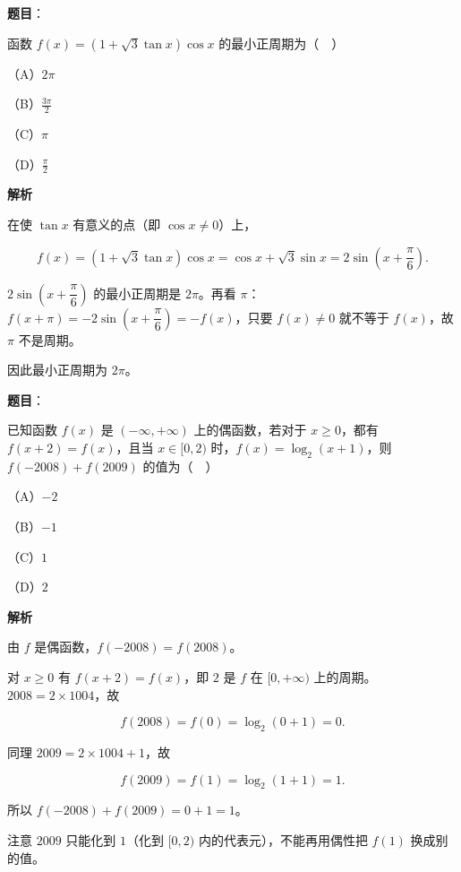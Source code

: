 \begin{answer}

\textbf{题目}：

函数 $f(x)=(1+\sqrt3\tan x)\cos x$ 的最小正周期为（　）

（A）$2\pi$

（B）$\frac{3\pi}{2}$

（C）$\pi$

（D）$\frac{\pi}{2}$

\textbf{解析}

在使 $\tan x$ 有意义的点（即 $\cos x\neq0$）上，

\nopagebreak[4]
\[f(x)=(1+\sqrt3\tan x)\cos x=\cos x+\sqrt3\sin x=2\sin\left(x+\frac{\pi}{6}\right).\]

$2\sin\left(x+\dfrac{\pi}{6}\right)$ 的最小正周期是 $2\pi$。再看 $\pi$：$f(x+\pi)=-2\sin\left(x+\dfrac{\pi}{6}\right)=-f(x)$，只要 $f(x)\neq0$ 就不等于 $f(x)$，故 $\pi$ 不是周期。

因此最小正周期为 $2\pi$。


\end{answer}
\begin{answer}

\textbf{题目}：

已知函数 $f(x)$ 是 $(-\infty,+\infty)$ 上的偶函数，若对于 $x\geqslant0$，都有 $f(x+2)=f(x)$，且当 $x\in[0,2)$ 时，$f(x)=\log_2(x+1)$，则 $f(-2008)+f(2009)$ 的值为（　）

（A）$-2$

（B）$-1$

（C）$1$

（D）$2$

\textbf{解析}

由 $f$ 是偶函数，$f(-2008)=f(2008)$。

对 $x\geqslant0$ 有 $f(x+2)=f(x)$，即 $2$ 是 $f$ 在 $[0,+\infty)$ 上的周期。$2008=2\times1004$，故

\nopagebreak[4]
\[f(2008)=f(0)=\log_2(0+1)=0.\]

同理 $2009=2\times1004+1$，故

\nopagebreak[4]
\[f(2009)=f(1)=\log_2(1+1)=1.\]

所以 $f(-2008)+f(2009)=0+1=1$。

注意 $2009$ 只能化到 $1$（化到 $[0,2)$ 内的代表元），不能再用偶性把 $f(1)$ 换成别的值。


\end{answer}

